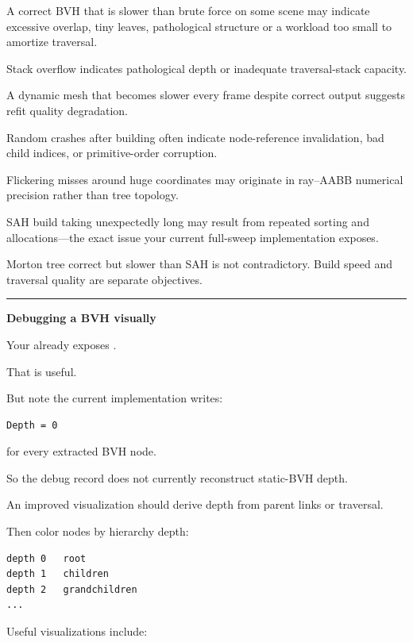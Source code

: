 A correct BVH that is slower than brute force on some scene may indicate excessive overlap, tiny leaves, pathological structure or a workload too small to amortize traversal.

Stack overflow indicates pathological depth or inadequate traversal-stack capacity.

A dynamic mesh that becomes slower every frame despite correct output suggests refit quality degradation.

Random crashes after building often indicate node-reference invalidation, bad child indices, or primitive-order corruption.

Flickering misses around huge coordinates may originate in ray--AABB numerical precision rather than tree topology.

SAH build taking unexpectedly long may result from repeated sorting and allocations---the exact issue your current full-sweep implementation exposes.

Morton tree correct but slower than SAH is not contradictory. Build speed and traversal quality are separate objectives.

\begin{center}\rule{0.5\linewidth}{0.5pt}\end{center}

\textbf{Debugging a BVH visually}

Your  already exposes .

That is useful.

But note the current implementation writes:

\begin{verbatim}
Depth = 0
\end{verbatim}

for every extracted BVH node.

So the debug record does not currently reconstruct static-BVH depth.

An improved visualization should derive depth from parent links or traversal.

Then color nodes by hierarchy depth:

\begin{verbatim}
depth 0   root
depth 1   children
depth 2   grandchildren
...
\end{verbatim}

Useful visualizations include:

